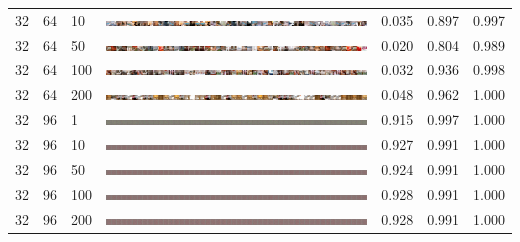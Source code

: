 \documentclass[a4paper]{article}
\begin{document}
\begin{table}[h!]
\begin{center}
{\begin{tabular}{lllcccc}
      32 & 64 & 10  & \includegraphics[width=\textwidth,trim={1536px 0 0 0},clip]{figures/bedrooms_g32_d64_ep10_generator.jpg}   & 0.035 & 0.897 & 0.997\\
      32 & 64 & 50  & \includegraphics[width=\textwidth,trim={1536px 0 0 0},clip]{figures/bedrooms_g32_d64_ep50_generator.jpg}   & 0.020 & 0.804 & 0.989\\
      32 & 64 & 100 & \includegraphics[width=\textwidth,trim={1536px 0 0 0},clip]{figures/bedrooms_g32_d64_ep100_generator.jpg}  & 0.032 & 0.936 & 0.998\\
      32 & 64 & 200 & \includegraphics[width=\textwidth,trim={1536px 0 0 0},clip]{figures/bedrooms_g32_d64_ep200_generator.jpg}  & 0.048 & 0.962 & 1.000\\
      \hline
      32 & 96 & 1   & \includegraphics[width=\textwidth,trim={1536px 0 0 0},clip]{figures/bedrooms_g32_d96_ep1_generator.jpg}    & 0.915 & 0.997 & 1.000\\
      32 & 96 & 10  & \includegraphics[width=\textwidth,trim={1536px 0 0 0},clip]{figures/bedrooms_g32_d96_ep10_generator.jpg}   & 0.927 & 0.991 & 1.000\\
      32 & 96 & 50  & \includegraphics[width=\textwidth,trim={1536px 0 0 0},clip]{figures/bedrooms_g32_d96_ep50_generator.jpg}   & 0.924 & 0.991 & 1.000\\
      32 & 96 & 100 & \includegraphics[width=\textwidth,trim={1536px 0 0 0},clip]{figures/bedrooms_g32_d96_ep100_generator.jpg}  & 0.928 & 0.991 & 1.000\\
      32 & 96 & 200 & \includegraphics[width=\textwidth,trim={1536px 0 0 0},clip]{figures/bedrooms_g32_d96_ep200_generator.jpg}  & 0.928 & 0.991 & 1.000\\

\end{tabular}}
\end{center}
\end{table}
\end{document}
